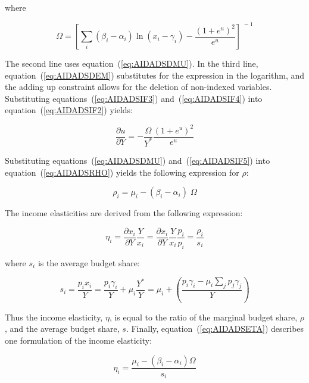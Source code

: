 \noindent where

\begin{equation}
\label{eq:AIDADSOMEGA}
\Omega  = {\left[ {\sum\limits_i {\left( {{\beta _i} - {\alpha _i}} \right)
   \ln \left( {{x_i} - {\gamma _i}} \right) -
   \frac{{{{\left( {1 + {e^u}} \right)}^2}}}{{{e^u}}}} } \right]^{\; - 1}}
\end{equation}

\noindent The second line uses equation~(\ref{eq:AIDADSDMU}).
In the third line, equation~(\ref{eq:AIDADSDEM})
substitutes for the expression in the logarithm, and the adding up constraint allows for the
deletion of non-indexed variables. Substituting equations~(\ref{eq:AIDADSIF3})
and~(\ref{eq:AIDADSIF4}) into equation~(\ref{eq:AIDADSIF2}) yields:

\begin{equation}
\label{eq:AIDADSIF5}
\frac{{\partial u}}{{\partial Y}} =
- \frac{\Omega }{{{Y^*}}}\frac{{{{\left( {1 + {e^u}} \right)}^2}}}{{{e^u}}}
\end{equation}

\noindent Substituting equations~(\ref{eq:AIDADSDMU}) and~(\ref{eq:AIDADSIF5}) into
equation~(\ref{eq:AIDADSRHO}) yields the following expression for $\rho$:

\[
{\rho _i} = {\mu _i} - \left( {{\beta _i} - {\alpha _i}} \right)\;\Omega
\]

\noindent The income elasticities are derived from the following expression:

\[
{\eta _i} = \frac{{\partial {x_i}}}{{\partial Y}}\frac{Y}{{{x_i}}} =
   \frac{{\partial {x_i}}}{{\partial Y}}\frac{Y}{{{x_i}}}
   \frac{{{p_i}}}{{{p_i}}} = \frac{{{\rho _i}}}{{{s_i}}}
\]

\noindent where $s_i$ is the average budget share:

\[
{s_i} = \frac{{{p_i}{x_i}}}{Y} = \frac{{{p_i}{\gamma _i}}}{Y} + {\mu _i}\frac{{{Y^*}}}{Y}
   = {\mu _i} + \left( {\frac{{{p_i}{\gamma _i}
   - {\mu _i}\sum\limits_j {{p_j}{\gamma _j}} }}{Y}} \right)
\]

\noindent Thus the income elasticity, $\eta$, is equal to the ratio of the marginal budget
share, $\rho$, and the average budget share, $s$. Finally, equation~(\ref{eq:AIDADSETA})
describes one formulation of the income elasticity:

\begin{equation}
\label{eq:AIDADSETA}
\eta _i =\frac{\mu_i - \left( \beta_i - \alpha_i \right) \Omega} {s_i}
\end{equation}

